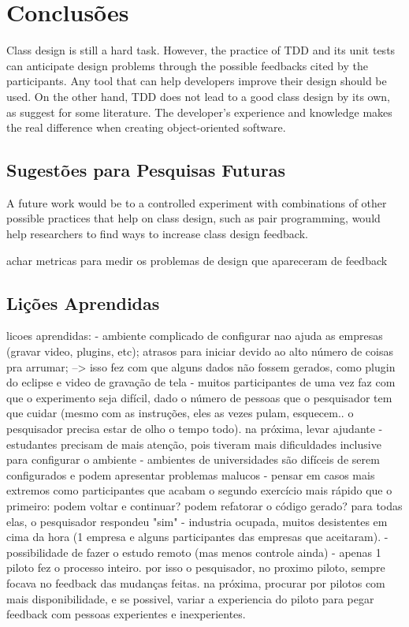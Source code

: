 \chapter{Conclusões}
\label{cap:conclusoes}

Class design is still a hard task. However, the practice of TDD and its unit tests can anticipate design problems through the possible feedbacks cited by the participants. Any tool that can help developers improve their design should be used. On the other hand, TDD does not lead to a good class design by its own, as suggest for some literature. The developer’s experience and knowledge makes the real difference when creating object-oriented software.


\section{Sugestões para Pesquisas Futuras} 

A future work would be to a controlled experiment with combinations of other possible practices that help on class design, such as pair programming, would help researchers to find ways to increase class design feedback.

achar metricas para medir os problemas de design que apareceram de feedback

\section{Lições Aprendidas}

licoes aprendidas:
- ambiente complicado de configurar nao ajuda as empresas (gravar video, plugins, etc); atrasos para iniciar devido ao alto número de coisas pra arrumar;
  --> isso fez com que alguns dados não fossem gerados, como plugin do eclipse e video de gravação de tela
- muitos participantes de uma vez faz com que o experimento seja difícil, dado o número de pessoas que o pesquisador tem que cuidar (mesmo com as instruções,
eles as vezes pulam, esquecem.. o pesquisador precisa estar de olho o tempo todo). na próxima, levar ajudante
- estudantes precisam de mais atenção, pois tiveram mais dificuldades inclusive para configurar o ambiente
- ambientes de universidades são difíceis de serem configurados e podem apresentar problemas malucos
- pensar em casos mais extremos como participantes que acabam o segundo exercício mais rápido que o primeiro: podem voltar e continuar? podem refatorar
o código gerado? para todas elas, o pesquisador respondeu "sim"
- industria ocupada, muitos desistentes em cima da hora (1 empresa e alguns participantes das empresas que aceitaram).
- possibilidade de fazer o estudo remoto (mas menos controle ainda)
- apenas 1 piloto fez o processo inteiro. por isso o pesquisador, no proximo piloto, sempre focava no feedback das mudanças feitas. na próxima,
procurar por pilotos com mais disponibilidade, e se possivel, variar a experiencia do piloto para pegar feedback com pessoas experientes e inexperientes.

